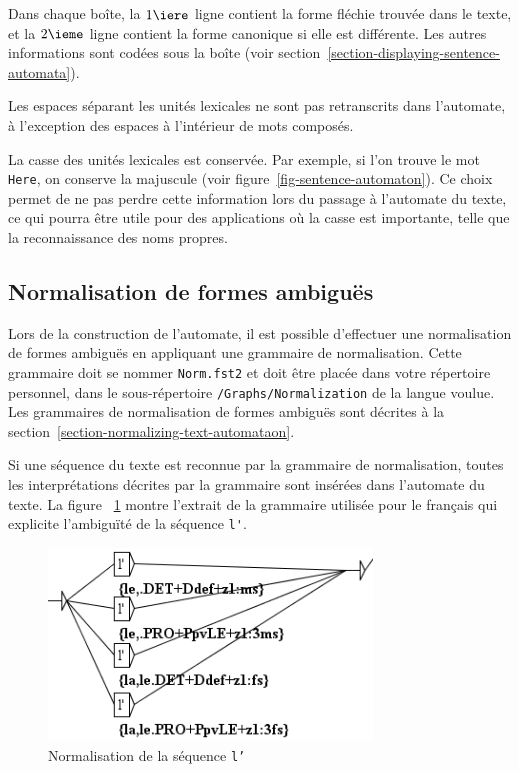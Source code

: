 \bigskip
\noindent Dans chaque boîte, la $1\iere$  ligne contient la forme fléchie trouvée dans le texte, et
la $2\ieme$ ligne contient la forme canonique si elle est différente. Les autres informations sont
codées sous la boîte (voir section~\ref{section-displaying-sentence-automata}).

\bigskip
\noindent Les espaces séparant les unités lexicales ne sont pas retranscrits dans l’automate, 
à l’exception des espaces à l’intérieur de mots composés.


\bigskip
\noindent La casse des unités lexicales est conservée. Par exemple, si l’on trouve le mot
\verb+Here+, on conserve la majuscule (voir figure~\ref{fig-sentence-automaton}). Ce choix permet 
de ne pas perdre cette information lors du passage à l’automate du texte, ce qui pourra être utile
pour des applications où la casse est importante, telle que la reconnaissance des noms propres.


\subsection{Normalisation de formes ambiguës}
Lors de la construction de l’automate, il est possible d’effectuer une normalisation de
formes ambiguës en appliquant une grammaire de normalisation. Cette grammaire doit
se nommer \verb+Norm.fst2+ et doit être placée dans votre répertoire personnel, dans le sous-répertoire
 \verb+/Graphs/Normalization+ de la langue voulue. Les grammaires de normalisation de formes ambiguës sont décrites à la section~\ref{section-normalizing-text-automataon}.

\bigskip
\noindent Si une séquence du texte est reconnue par la grammaire de normalisation, toutes les
interprétations décrites par la grammaire sont insérées dans l’automate du texte. La figure
~\ref{fig-example-tfst-normalization-graph} montre l’extrait de la grammaire utilisée pour
le français qui explicite l’ambiguïté de la séquence \verb+l'+.

\begin{figure}[!ht]
\begin{center}
\includegraphics[width=8.6cm]{resources/img/fig7-4.png}
\caption{Normalisation de la séquence \texttt{l'}\label{fig-example-tfst-normalization-graph}}
\end{center}
\end{figure}

